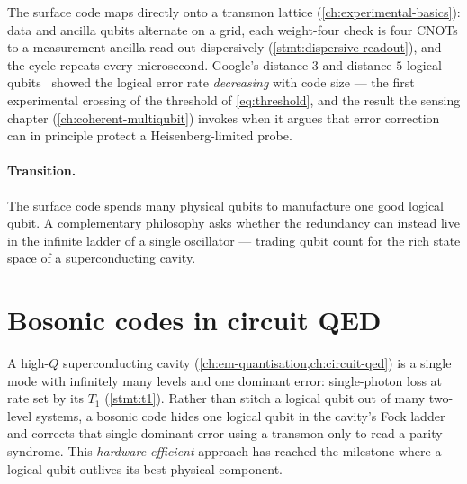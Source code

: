 \begin{application}
\label{app:surface-cqed}
The surface code maps directly onto a transmon lattice
(\cref{ch:experimental-basics}): data and ancilla qubits alternate on a
grid, each weight-four check is four CNOTs to a measurement ancilla read
out dispersively (\cref{stmt:dispersive-readout}), and the cycle repeats
every microsecond. Google's distance-$3$ and distance-$5$ logical
qubits~\cite{acharya2023} showed the logical error rate \emph{decreasing}
with code size --- the first experimental crossing of the threshold of
\cref{eq:threshold}, and the result the
sensing chapter (\cref{ch:coherent-multiqubit}) invokes when it argues
that error correction can in principle protect a Heisenberg-limited
probe.
\end{application}

\paragraph{Transition.}
The surface code spends many physical qubits to manufacture one good
logical qubit. A complementary philosophy asks whether the redundancy
can instead live in the infinite ladder of a single oscillator ---
trading qubit count for the rich state space of a superconducting cavity.

\section{Bosonic codes in circuit QED}
\label{sec:bosonic-codes}

\begin{phenomenon}
A high-$Q$ superconducting cavity (\cref{ch:em-quantisation,ch:circuit-qed})
is a single mode with infinitely many levels and one dominant error:
single-photon loss at rate set by its $T_1$ (\cref{stmt:t1}). Rather than
stitch a logical qubit out of many two-level systems, a bosonic code
hides one logical qubit in the cavity's Fock ladder and corrects that
single dominant error using a transmon only to read a parity syndrome.
This \emph{hardware-efficient} approach has reached the milestone where a
logical qubit outlives its best physical component.
\end{phenomenon}

